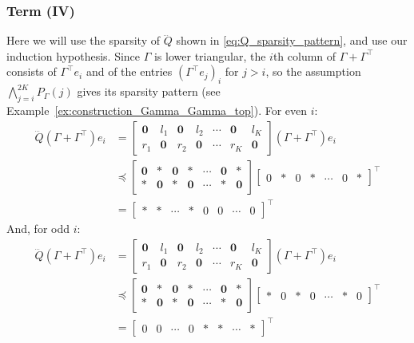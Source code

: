 \documentclass[a4paper,12pt]{article}
\theoremstyle{definition}
\begin{document}
\subsubsection{Term (IV)}
Here we will use the sparsity of $\dddot{Q}$ shown in \eqref{eq:Q_sparsity_pattern}, and use our induction hypothesis. Since $\Gamma$ is lower triangular, the $i$th column of $\Gamma + \Gamma^\top$ consists of $\Gamma^\top e_i$ and of the entries $(\Gamma^\top e_j)_i$ for $j > i$, so the assumption $\bigwedge_{j=i}^{2K} P_\Gamma(j)$ gives its sparsity pattern (see Example~\ref{ex:construction_Gamma_Gamma_top}). For even $i$:
\begin{align}
    \dddot{Q}(\Gamma + \Gamma^\top)e_i &= \begin{bmatrix} \mathbf{0} & l_1 & \mathbf{0} & l_2 & \cdots & \mathbf{0} & l_K \\ 
        r_1 & \mathbf{0} & r_2 & \mathbf{0} & \cdots & r_K & \mathbf{0} \end{bmatrix} (\Gamma + \Gamma^\top)e_i
        \\
        &\preceq \begin{bmatrix} \mathbf{0} & \mathbf{*} & \mathbf{0} & \mathbf{*} & \cdots & \mathbf{0} & \mathbf{*} \\ 
            \mathbf{*} & \mathbf{0} & \mathbf{*} & \mathbf{0} & \cdots & \mathbf{*} & \mathbf{0} \end{bmatrix} \begin{bmatrix} 0 & * & 0 &  * & \cdots & 0 & *\end{bmatrix} ^\top
            \\
            &= \begin{bmatrix} * & * & \cdots &  * & 0 & 0 &\cdots & 0\end{bmatrix} ^\top
\end{align}
And, for odd $i$:
\begin{align}
\dddot{Q}(\Gamma + \Gamma^\top)e_i &= \begin{bmatrix} \mathbf{0} & l_1 & \mathbf{0} & l_2 & \cdots & \mathbf{0} & l_K \\ 
        r_1 & \mathbf{0} & r_2 & \mathbf{0} & \cdots & r_K & \mathbf{0} \end{bmatrix} (\Gamma + \Gamma^\top)e_i
        \\
        &\preceq \begin{bmatrix} \mathbf{0} & \mathbf{*} & \mathbf{0} & \mathbf{*} & \cdots & \mathbf{0} & \mathbf{*} \\ 
            \mathbf{*} & \mathbf{0} & \mathbf{*} & \mathbf{0} & \cdots & \mathbf{*} & \mathbf{0} \end{bmatrix} \begin{bmatrix} * & 0 & * & 0 &  \cdots & * & 0\end{bmatrix} ^\top
            \\
            &= \begin{bmatrix} 0 & 0 & \cdots &  0 & * & * &\cdots & *\end{bmatrix} ^\top
\end{align}
\end{document}
